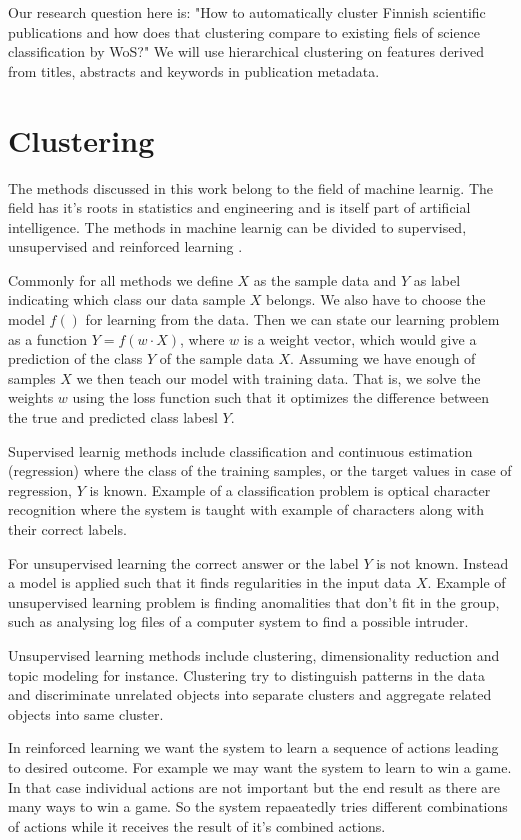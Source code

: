 Our research question here is: "How to automatically cluster 
Finnish scientific publications and how does that clustering 
compare to existing fiels of science classification by WoS?" We 
will use hierarchical clustering on features derived from titles,
abstracts and keywords in publication metadata.


\section{Clustering}
The methods discussed in this work belong to the field of machine 
learnig. The field has it's roots in statistics and engineering 
and is itself part of artificial intelligence.
The methods in machine learnig can be divided to supervised, 
unsupervised and reinforced learning \cite{alpaydin2004introduction}.

Commonly for all methods we define $X$ as
the sample data and $Y$ as label indicating which class our data 
sample $X$ belongs. We also have to choose the model $f()$ for
learning from the data. Then we can state our learning problem as
a function $Y = f(w \cdot X)$, where $w$ is a weight vector, 
which would give a prediction of the class $Y$ of the sample data
$X$. 
Assuming we have enough of samples $X$ we then teach our model 
with training data. That is, we solve the weights $w$ using the
loss function such that it optimizes the difference between the 
true and predicted class labesl $Y$.

Supervised learnig methods include classification and continuous 
estimation (regression)
where the class of the training samples, or the target values in 
case of regression, $Y$ is known. Example of a classification 
problem is optical character recognition where the system is 
taught with example of characters along with their correct labels.

For unsupervised learning the correct answer or the label $Y$ is not known. 
Instead a model is applied such that it finds regularities in the
input data $X$. Example of unsupervised learning problem is 
finding anomalities that don't fit in the group, such as analysing
log files of a computer system to find a possible intruder.

Unsupervised learning methods include clustering, dimensionality
reduction and topic modeling for instance. Clustering try to 
distinguish patterns in the data and discriminate unrelated 
objects into separate clusters and aggregate related objects into
same cluster.

In reinforced learning we want the system to learn a sequence of
actions leading to desired outcome. For example we may want the 
system to learn to win a game. In that case individual actions
are not important but the end result as there are many ways to win
a game. So the system repaeatedly tries different combinations of
actions while it receives the result of it's combined actions.

